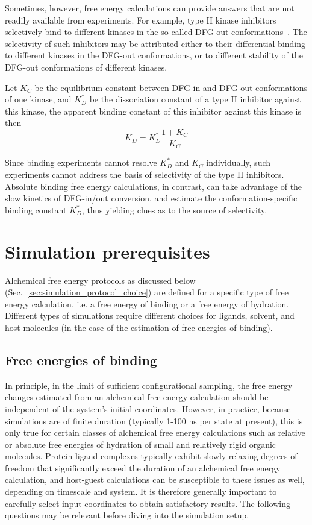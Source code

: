 \documentclass[9pt,bestpractices]{livecoms}
\begin{document}
Sometimes, however, free energy calculations can provide answers that are not
readily available from experiments. For example, type II kinase
inhibitors selectively bind to different kinases in the so-called
DFG-out conformations~\cite{schindler2000structural}. The selectivity of such
inhibitors may be attributed either to their differential binding to
different kinases in the DFG-out conformations, or to different
stability of the DFG-out conformations of different kinases. 

Let
$K_C$ be the equilibrium constant between DFG-in and DFG-out
conformations of one kinase, and $K_D^\ast$ be the dissociation
constant of a type II inhibitor against this kinase, the apparent
binding constant of this inhibitor against this kinase is then
\begin{equation}
  K_D = K_D^\ast \frac{1 + K_C}{K_C}
  \label{eqn:conformational-binding}
\end{equation}

Since binding experiments cannot resolve $K_D^\ast$ and $K_C$ individually, such experiments cannot address the basis of selectivity of the type II inhibitors. Absolute binding free energy calculations, in contrast, can take advantage of the slow kinetics of DFG-in/out conversion, and estimate the conformation-specific binding constant $K_D^\ast$, thus yielding clues as to the source of selectivity.

%
%
\section{Simulation prerequisites}
\label{sec:prerequisites}
Alchemical free energy protocols as discussed below (Sec.~\ref{sec:simulation_protocol_choice}) are defined for a specific type of free energy calculation, i.e. a free energy of binding or a free energy of hydration. Different types of simulations require different choices for ligands, solvent, and host molecules (in the case of the estimation of free energies of binding).

\subsection{Free energies of binding}
\label{subsec:binding}
In principle, in the limit of sufficient configurational sampling, the free energy changes estimated from an alchemical free energy calculation should be independent of the system's initial coordinates. However, in practice, because simulations are of finite duration (typically 1-100 ns per state at present), this is only true for certain classes of alchemical free energy calculations such as relative or absolute free energies of hydration of small and relatively rigid organic molecules. Protein-ligand complexes typically exhibit slowly relaxing degrees of freedom that significantly exceed the duration of an alchemical free energy calculation, and host-guest calculations can be susceptible to these issues as well, depending on timescale and system. It is therefore generally important to carefully select input coordinates to obtain satisfactory results. 
The following questions may be relevant before diving into the simulation setup.
\end{document}
